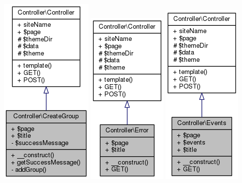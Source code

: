 \documentclass[11pt]{article}
\begin{document}
\includegraphics[scale=0.4]{UML_Controller_1_1CreateGroup.png}
\includegraphics[scale=0.4]{UML_Controller_1_1Error.png}
\includegraphics[scale=0.4]{UML_Controller_1_1Events.png}
\end{document}
